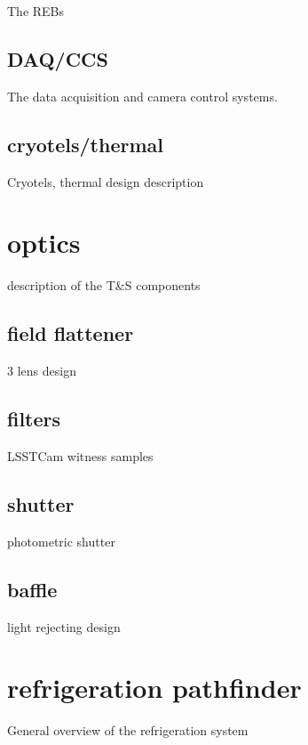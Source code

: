 The REBs

\subsection{DAQ/CCS}

The data acquisition and camera control systems.

\subsection{cryotels/thermal}

Cryotels, thermal design description

\section{optics}

description of the T\&S components

\subsection{field flattener}

3 lens design

\subsection{filters}

LSSTCam witness samples

\subsection{shutter}

photometric shutter

\subsection{baffle}

light rejecting design

\section{refrigeration pathfinder}

General overview of the refrigeration system


